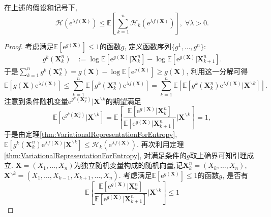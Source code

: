 \begin{lemma}[熵的张量化]\label{lemma:EntropyTensorization}
	在上述的假设和记号下, 
	\begin{equation*}
		\mathcal{H}(\mathrm{e}^{\lambda f(\bm{X})})
		\leq \mathbb{E}\left[ \sum_{k=1}^n \mathcal{H}_k (\mathrm{e}^{\lambda f(\bm{X})}) \right],\; 
		\forall \lambda > 0. 
	\end{equation*}
\end{lemma}
\begin{proof}
	考虑满足$\mathbb{E}[\mathrm{e}^{g(\bm{X})}] \leq 1$的函数$g$, 定义函数序列$\{g^1, \dots, g^n\}$: 
	\begin{align*}
		g^k(\bm{X}_k^n) &:= \log \mathbb{E}[\mathrm{e}^{g(\bm{X})} | \bm{X}_k^n] - \log \mathbb{E}[\mathrm{e}^{g(\bm{X})} | \bm{X}_{k+1}^n]. 
	\end{align*}
	于是$\sum_{k=1}^n g^k(\bm{X}_k^n) = g(\bm{X}) - \log \mathbb{E}[ \mathrm{e}^{g(\bm{X})} ] \geq g(\bm{X})$, 利用这一分解可得
	\begin{equation*}
		\mathbb{E}[ g(\bm{X}) \mathrm{e}^{\lambda f(\bm{X})}]
		\leq \sum_{k=1}^n \mathbb{E}[ g^k(\bm{X}_k^n) \mathrm{e}^{\lambda f(\bm{X})} ] 
		= \sum_{k=1}^n \mathbb{E}\left[ \mathbb{E}[ g^k(\bm{X}_k^n) \mathrm{e}^{\lambda f(\bm{X})} | \bm{X}^{\backslash k} ] \right]. 
	\end{equation*}
	注意到条件随机变量$\mathrm{e}^{g^k(\bm{X}_k^n)}| \bm{X}^{\backslash k}$的期望满足
	\begin{equation*}
		\mathbb{E}[\mathrm{e}^{g^k(\bm{X}_k^n)}| \bm{X}^{\backslash k}]
		= \mathbb{E} \left[ \frac{\mathbb{E}[\mathrm{e}^{g(\bm{X})} | \bm{X}_k^n]}{\mathbb{E}[\mathrm{e}^{g(\bm{X})} | \bm{X}_{k+1}^n]} \bigg| \bm{X}^{\backslash k} \right]
		=1,  
	\end{equation*}
	于是由定理\ref{thm:VariationalRepresentationForEntropy}, $\mathbb{E}[ g^k(\bm{X}_k^n) \mathrm{e}^{\lambda f(\bm{X})} | \bm{X}^{\backslash k} ] \leq \mathcal{H}_k(\mathrm{e}^{\lambda f(\bm{X})})$. 
	再次利用定理\ref{thm:VariationalRepresentationForEntropy}, 对满足条件的$g$取上确界可知引理成立. 
	\sp 
	$\bm{X} = (X_1, \dots, X_n)$为独立随机变量构成的随机向量,记$\bm{X}_k^n = (X_k, \dots, X_n)$, $\bm{X}^{\backslash k} = (X_1, \dots, X_{k-1}, X_{k+1}, \dots, X_n)$. 
	考虑满足$\mathbb{E}[\mathrm{e}^{g(\bm{X})}] \leq 1$的函数$g$, 是否有
	\begin{equation*}
		\mathbb{E} \left[ \frac{\mathbb{E}[\mathrm{e}^{g(\bm{X})} | \bm{X}_k^n]}{\mathbb{E}[\mathrm{e}^{g(\bm{X})} | \bm{X}_{k+1}^n]} \bigg| \bm{X}^{\backslash k} \right] \leq 1
	\end{equation*}
	\sp 
\end{proof}

